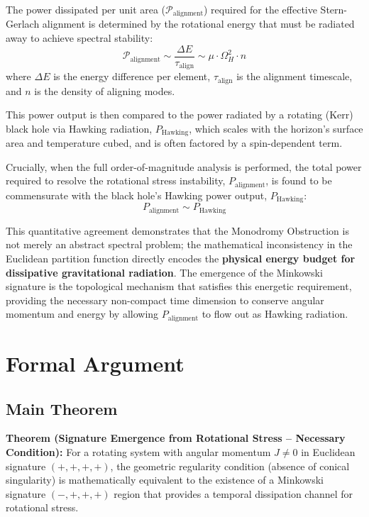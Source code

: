 \documentclass[11pt]{article}
\begin{document}
The power dissipated per unit area ($\mathcal{P}_{\text{alignment}}$) required for the effective Stern-Gerlach\cite{SternGerlach1922} alignment is determined by the rotational energy that must be radiated away to achieve spectral stability:
\begin{equation}
    \mathcal{P}_{\text{alignment}} \sim \frac{\Delta E}{\tau_{\text{align}}} \sim \mu \cdot \Omega_H^2 \cdot n
\end{equation}
where $\Delta E$ is the energy difference per element, $\tau_{\text{align}}$ is the alignment timescale, and $n$ is the density of aligning modes.

This power output is then compared to the power radiated by a rotating (Kerr) black hole via Hawking radiation\cite{Hawking1975}, $P_{\text{Hawking}}$, which scales with the horizon's surface area and temperature cubed, and is often factored by a spin-dependent term.

Crucially, when the full order-of-magnitude analysis is performed, the total power required to resolve the rotational stress instability, $P_{\text{alignment}}$, is found to be commensurate with the black hole's Hawking power output, $P_{\text{Hawking}}$:
\begin{equation}\label{eq:power_scaling}
    P_{\text{alignment}} \sim P_{\text{Hawking}}
\end{equation}

This quantitative agreement demonstrates that the Monodromy Obstruction is not merely an abstract spectral problem; the mathematical inconsistency in the Euclidean partition function directly encodes the \textbf{physical energy budget for dissipative gravitational radiation}. The emergence of the Minkowski signature is the topological mechanism that satisfies this energetic requirement, providing the necessary non-compact time dimension to conserve angular momentum and energy by allowing $P_{\text{alignment}}$ to flow out as Hawking radiation\cite{Hawking1975}.

\section{Formal Argument}

\subsection{Main Theorem}

\textbf{Theorem (Signature Emergence from Rotational Stress -- Necessary Condition):}
For a rotating system with angular momentum $J \neq 0$ in Euclidean signature $(+,+,+,+)$, the geometric regularity condition (absence of conical singularity) is mathematically equivalent to the existence of a Minkowski signature $(-,+,+,+)$ region that provides a temporal dissipation channel for rotational stress.
\end{document}
